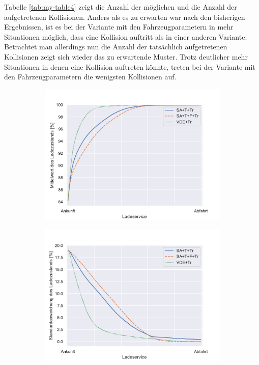 Tabelle \ref{tab:my-table4} zeigt die Anzahl der möglichen und die Anzahl der aufgetretenen Kollisionen. Anders als es zu erwarten war nach den bisherigen Ergebnissen, ist es bei der Variante mit den Fahrzeugparametern in mehr Situationen möglich, dass eine Kollision auftritt als in einer anderen Variante. Betrachtet man allerdings nun die Anzahl der tatsächlich aufgetretenen Kollisionen zeigt sich wieder das zu erwartende Muster. Trotz deutlicher mehr Situationen in denen eine Kollision auftreten könnte, treten bei der Variante mit den Fahrzeugparametern die wenigsten Kollisionen auf.
\begin{figure}
	\begin{subfigure}{0.49\linewidth}
		\includegraphics[width=\linewidth]{img/mitTrafo/SlottedAloha_participants_VDE_tau_trafo_13_soc_mean.pdf}
        \label{ABB_mt_SocMEAN}
	\end{subfigure}
	\begin{subfigure}{0.49\linewidth}
		\includegraphics[width=\linewidth]{img/mitTrafo/SlottedAloha_participants_VDE_tau_trafo_13_soc_std.pdf}

\end{subfigure}
\end{figure}
